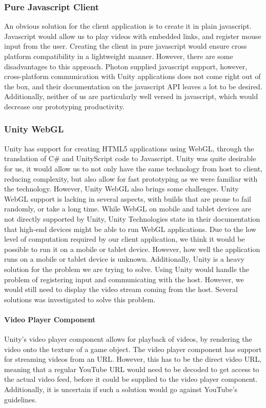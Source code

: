 \subsubsection{Pure Javascript Client}
An obvious solution for the client application is to create it in plain javascript. Javascript would allow us to play videos with embedded links, and register mouse input from the user. Creating the client in pure javascript would ensure cross platform compatibility in a lightweight manner. However, there are some disadvantages to this approach. Photon supplied javascript support, however, cross-platform communication with Unity applications does not come right out of the box\cite{photon_javascript}, and their documentation on the javascript API leaves a lot to be desired. Additionally, neither of us are particularly well versed in javascript, which would decrease our prototyping productivity. 

\subsubsection{Unity WebGL}
Unity has support for creating HTML5 applications using WebGL\cite{unity_webgl}, through the translation of C\# and UnityScript code to Javascript. Unity was quite desirable for us, it would allow us to not only have the same technology from host to client, reducing complexity, but also allow for fast prototyping as we were familiar with the technology. 
However, Unity WebGL also brings some challenges. Unity WebGL support is lacking in several aspects, with builds that are prone to fail randomly, or take a long time. While WebGL on mobile and tablet devices are not directly supported by Unity, Unity Technologies state in their documentation that high-end devices might be able to run WebGL applications. Due to the low level of computation required by our client application, we think it would be possible to run it on a mobile or tablet device. However, how well the application runs on a mobile or tablet device is unknown. Additionally, Unity is a heavy solution for the problem we are trying to solve.
Using Unity would handle the problem of registering input and communicating with the host. However, we would still need to display the video stream coming from the host. Several solutions was investigated to solve this problem.

\paragraph{Video Player Component}
Unity's video player component allows for playback of videos, by rendering the video onto the texture of a game object\cite{unity_video_player}. The video player component has support for streaming videos from an URL. However, this has to be the direct video URL, meaning that a regular YouTube URL would need to be decoded to get access to the actual video feed, before it could be supplied to the video player component. Additionally, it is uncertain if such a solution would go against YouTube's guidelines\cite[5.1 A]{youtube_guidelines}.

